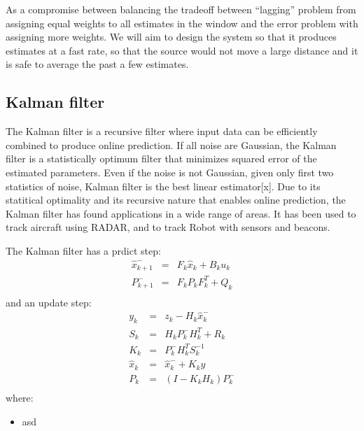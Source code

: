 As a compromise between balancing the tradeoff between ``lagging'' problem from assigning equal weights to all estimates in the window and the error problem with assigning more weights. We will aim to design the system so that it produces estimates at a fast rate, so that the source would not move a large distance and it is safe to average the past a few estimates.

\subsection{Kalman filter}
The Kalman filter is a recursive filter where input data can be efficiently combined to produce online prediction. If all noise are Gaussian, the Kalman filter is a statistically optimum filter that minimizes squared error of the estimated parameters. Even if the noise is not Gaussian, given only first two statistics of noise, Kalman filter is the best linear estimator[x]. Due to its statitical optimality and its recursive nature that enables online prediction, the Kalman filter has found applications in a wide range of areas. It has been used to track aircraft using RADAR, and to track Robot with sensors and beacons.

The Kalman filter has a prdict step:
\begin{eqnarray}
\hat{x}_{k+1}^- & = &F_k \hat{x}_k + B_ku_k\\
P_{k+1}^- & = & F_kP_kF_k^T + Q_k\\
\end{eqnarray}
and an update step:
\begin{eqnarray}
y_k & = & z_k - H_k\hat{x}_k^-\\
S_k & = & H_kP_k^-H_k^T + R_k \\
K_k & = & P_k^-H_k^TS_k^{-1}\\
\hat{x}_k & = & \hat{x}_k^- + K_ky\\
P_k & = & (I-K_kH_k)P_k^-\\
\end{eqnarray}
where:
\begin{itemize}
\item asd
\end{itemize}

